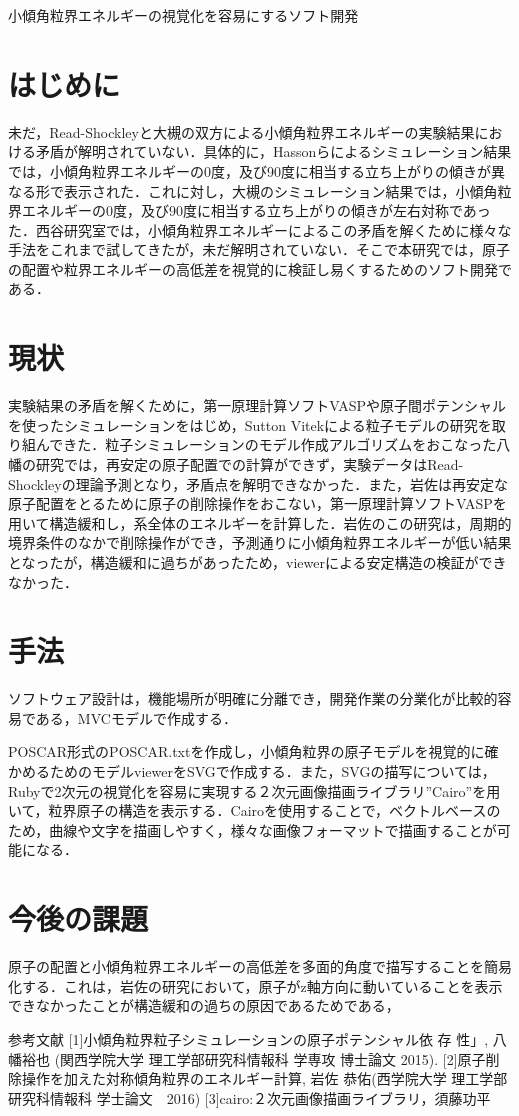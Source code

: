 \documentclass[a4j,twocolumn]{jsarticle}
\begin{document}
小傾角粒界エネルギーの視覚化を容易にするソフト開発

\section{はじめに}
未だ，Read-Shockleyと大槻の双方による小傾角粒界エネルギーの実験結果における矛盾が解明されていない．具体的に，Hassonらによるシミュレーション結果では，小傾角粒界エネルギーの0度，及び90度に相当する立ち上がりの傾きが異なる形で表示された．これに対し，大槻のシミュレーション結果では，小傾角粒界エネルギーの0度，及び90度に相当する立ち上がりの傾きが左右対称であった．西谷研究室では，小傾角粒界エネルギーによるこの矛盾を解くために様々な手法をこれまで試してきたが，未だ解明されていない．そこで本研究では，原子の配置や粒界エネルギーの高低差を視覚的に検証し易くするためのソフト開発である．

\section{現状}
実験結果の矛盾を解くために，第一原理計算ソフトVASPや原子間ポテンシャルを使ったシミュレーションをはじめ，Sutton Vitekによる粒子モデルの研究を取り組んできた．粒子シミュレーションのモデル作成アルゴリズムをおこなった八幡の研究では，再安定の原子配置での計算ができず，実験データはRead-Shockleyの理論予測となり，矛盾点を解明できなかった．また，岩佐は再安定な原子配置をとるために原子の削除操作をおこない，第一原理計算ソフトVASPを用いて構造緩和し，系全体のエネルギーを計算した．岩佐のこの研究は，周期的境界条件のなかで削除操作ができ，予測通りに小傾角粒界エネルギーが低い結果となったが，構造緩和に過ちがあったため，viewerによる安定構造の検証ができなかった．


\section{手法}
ソフトウェア設計は，機能場所が明確に分離でき，開発作業の分業化が比較的容易である，MVCモデルで作成する．

POSCAR形式のPOSCAR.txtを作成し，小傾角粒界の原子モデルを視覚的に確かめるためのモデルviewerをSVGで作成する．また，SVGの描写については，Rubyで2次元の視覚化を容易に実現する２次元画像描画ライブラリ”Cairo”を用いて，粒界原子の構造を表示する．Cairoを使用することで，ベクトルベースのため，曲線や文字を描画しやすく，様々な画像フォーマットで描画することが可能になる．



\section{今後の課題}
原子の配置と小傾角粒界エネルギーの高低差を多面的角度で描写することを簡易化する．これは，岩佐の研究において，原子がz軸方向に動いていることを表示できなかったことが構造緩和の過ちの原因であるためである，

参考文献
[1]小傾角粒界粒子シミュレーションの原子ポテンシャル依 存    性」, 八幡裕也 (関西学院大学 理工学部研究科情報科 学専攻 博士論文 2015).
[2]原子削除操作を加えた対称傾角粒界のエネルギー計算, 岩佐 恭佑(西学院大学 理工学部研究科情報科 学士論文　2016) 
[3]cairo:２次元画像描画ライブラリ，須藤功平
\end{document}
